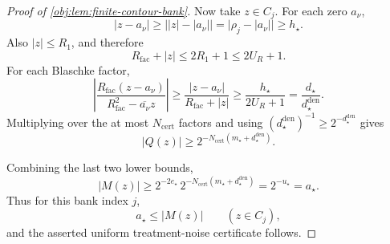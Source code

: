 \begin{proof}[Proof of \cref{obj:lem:finite-contour-bank}]
Now take \(z\in C_j\).  For each zero \(a_\nu\),
\[
|z-a_\nu|
\ge \bigl||z|-|a_\nu|\bigr|
=\bigl|\rho_j-|a_\nu|\bigr|
\ge h_\star.
\]
Also \(|z|\le R_1\), and therefore
\[
R_{\mathrm{fac}}+|z|\le 2R_1+1\le 2U_R+1.
\]
For each Blaschke factor,
\[
\left|
\frac{R_{\mathrm{fac}}(z-a_\nu)}
     {R_{\mathrm{fac}}^2-\overline{a_\nu}z}
\right|
\ge
\frac{|z-a_\nu|}{R_{\mathrm{fac}}+|z|}
\ge
\frac{h_\star}{2U_R+1}
=
\frac{d_\star}{d_\star^{\mathrm{den}}}.
\]
Multiplying over the at most \(N_{\mathrm{cert}}\) factors and using
\((d_\star^{\mathrm{den}})^{-1}\ge2^{-d_\star^{\mathrm{den}}}\) gives
\[
|Q(z)|
\ge
2^{-N_{\mathrm{cert}}(m_\star+d_\star^{\mathrm{den}})}.
\]

Combining the last two lower bounds,
\[
|M(z)|
\ge
2^{-2e_\star}\,
2^{-N_{\mathrm{cert}}(m_\star+d_\star^{\mathrm{den}})}
=
2^{-u_\star}
=a_\star.
\]
Thus for this bank index \(j\),
\[
a_\star\le |M(z)|\qquad (z\in C_j),
\]
and the asserted uniform treatment-noise certificate follows. %
\end{proof}
